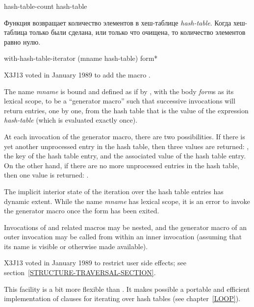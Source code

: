 \begin{defun}[Функция]
hash-table-count hash-table

Функция возвращает количество элементов в хеш-таблице \emph{hash-table}.
Когда хеш-таблица только были сделана, или только что очищена, то количество
элементов равно нулю.
\end{defun}

\begin{defmac}
with-hash-table-iterator (mname hash-table) {form}*

X3J13 voted in January 1989
to add the macro .

The name \emph{mname} is bound and defined as if by ,
with the body \emph{form\/}s as its lexical scope, to be a ``generator macro''
such that successive invocations  will
return entries, one by one, from the hash table that is the value of the
expression \emph{hash-table} (which is evaluated exactly once).

At each invocation of the generator macro, there are two possibilities.
If there is yet another unprocessed entry in the hash table, then
three values are returned: ,
the key of the hash table entry, and
the associated value of the hash table entry.
On the other hand, if there are no more unprocessed entries in the
hash table, then one value is returned: .

The implicit interior state of the iteration over the hash table
entries has dynamic extent.  While the name \emph{mname} has
lexical scope, it is an error to invoke the generator macro
once the  form has been exited.

Invocations of 
and related macros may be nested, and the generator macro of an
outer invocation may be called from within an inner invocation
(assuming that its name is visible or otherwise made available).

\begin{new}
X3J13 voted in January 1989
to restrict user side effects; see section~\ref{STRUCTURE-TRAVERSAL-SECTION}.
\end{new}

\beforenoterule
\begin{rationale}
This facility is a bit more flexible than .
It makes possible a portable and efficient implementation of 
clauses for iterating over hash tables (see chapter~\ref{LOOP}).
\end{rationale}
\afternoterule
\end{defmac}

